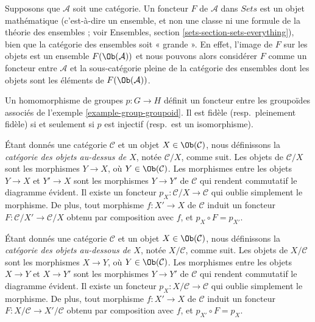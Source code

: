 \begin{remark}
\label{remark-functor-into-sets}
Supposons que $\mathcal{A}$ soit une catégorie.
Un foncteur $F$ de $\mathcal{A}$ dans $\textit{Sets}$
est un objet mathématique (c'est-à-dire un ensemble, et non une classe
ni une formule de la théorie des ensembles ; voir
Ensembles, section \ref{sets-section-sets-everything}),
bien que la catégorie des ensembles soit « grande ».
En effet, l'image de $F$ sur les objets est
un ensemble $F(\Ob(\mathcal{A}))$ et nous pouvons alors
considérer $F$ comme un foncteur entre
$\mathcal{A}$ et la sous-catégorie pleine
de la catégorie des ensembles dont les objets
sont les éléments de $F(\Ob(\mathcal{A}))$.
\end{remark}

\begin{example}
\label{example-group-homomorphism-functor}
Un homomorphisme de groupes $p : G\to H$ définit un foncteur entre
les groupoïdes associés de l'exemple \ref{example-group-groupoid}. Il est
fidèle (resp.\ pleinement fidèle) si et seulement si $p$ est injectif
(resp.\ est un isomorphisme).
\end{example}

\begin{example}
\label{example-category-over-X}
Étant donnés une catégorie $\mathcal{C}$ et un objet
$X\in \Ob(\mathcal{C})$, nous définissons la
{\it catégorie des objets au-dessus de $X$},
notée $\mathcal{C}/X$, comme suit.
Les objets de $\mathcal{C}/X$ sont les morphismes $Y\to X$,
où $Y\in \Ob(\mathcal{C})$. Les morphismes entre les objets
$Y\to X$ et $Y'\to X$ sont les morphismes $Y\to Y'$ de $\mathcal{C}$
qui rendent commutatif le diagramme évident. Il existe un foncteur
$p_X : \mathcal{C}/X\to \mathcal{C}$ qui oublie simplement le morphisme.
De plus, tout morphisme $f : X'\to X$ de $\mathcal{C}$ induit un foncteur
$F : \mathcal{C}/X' \to \mathcal{C}/X$ obtenu par composition avec $f$,
et $p_X\circ F = p_{X'}$.
\end{example}

\begin{example}
\label{example-category-under-X}
Étant donnés une catégorie $\mathcal{C}$ et un objet
$X\in \Ob(\mathcal{C})$, nous définissons la
{\it catégorie des objets au-dessous de $X$},
notée $X/\mathcal{C}$, comme suit.
Les objets de $X/\mathcal{C}$ sont les morphismes $X\to Y$,
où $Y\in \Ob(\mathcal{C})$. Les morphismes entre les objets
$X\to Y$ et $X\to Y'$ sont les morphismes $Y\to Y'$ de $\mathcal{C}$
qui rendent commutatif le diagramme évident. Il existe un foncteur
$p_X : X/\mathcal{C}\to \mathcal{C}$ qui oublie simplement le morphisme.
De plus, tout morphisme $f : X'\to X$ de $\mathcal{C}$ induit un foncteur
$F : X/\mathcal{C} \to X'/\mathcal{C}$
obtenu par composition avec $f$,
et $p_{X'}\circ F = p_X$.
\end{example}




